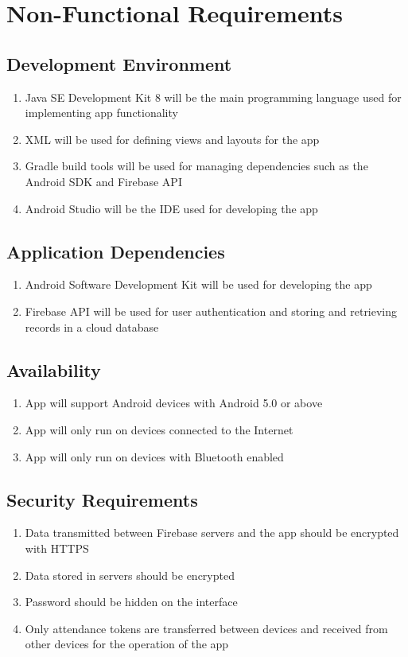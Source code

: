 \documentclass[../report.tex]{subfiles}
\begin{document}
\section{Non-Functional Requirements}
\subsection{Development Environment}
\begin{enumerate}
\item Java SE Development Kit 8 will be the main programming language used for implementing app functionality
\item XML will be used for defining views and layouts for the app
\item Gradle build tools will be used for managing dependencies such as the Android SDK and Firebase API
\item Android Studio will be the IDE used for developing the app
\end{enumerate}

\subsection{Application Dependencies}
\begin{enumerate}
\item Android Software Development Kit will be used for developing the app
\item Firebase API will be used for user authentication and storing and retrieving records in a cloud database
\end{enumerate}

\subsection{Availability}
\begin{enumerate}
\item App will support Android devices with Android 5.0 or above
\item App will only run on devices connected to the Internet
\item App will only run on devices with Bluetooth enabled
\end{enumerate}

\subsection{Security Requirements\cite{app-security}}
\begin{enumerate}
\item Data transmitted between Firebase servers and the app should be encrypted with HTTPS
\item Data stored in servers should be encrypted
\item Password should be hidden on the interface
\item Only attendance tokens are transferred between devices and received from other devices for the operation of the app
\end{enumerate}
\end{document}
